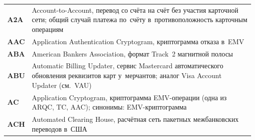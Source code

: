 %

\label{ch:glossary}

\begingroup
\footnotesize
\begin{longtable}{@{}p{4.5em}p{\dimexpr\linewidth-4.5em-2\tabcolsep\relax}@{}}
  \textbf{A2A}               & Account-to-Account, перевод со счёта на счёт без участия карточной сети; общий случай платежа по~счёту в~противоположность карточным операциям                                                                                                                       \\
  \textbf{AAC}               & Application Authentication Cryptogram, криптограмма отказа в~EMV                                                                                                                                                                                                                                 \\
  \textbf{ABA}               & American Bankers Association, формат Track~2 магнитной полосы                                                                                                                                                                                                                                    \\
  \textbf{ABU}               & Automatic Billing Updater, сервис Mastercard автоматического обновления реквизитов карт у~мерчантов; аналог Visa Account Updater (см.~VAU)                                                                                                                                                       \\
  \textbf{AC}                & Application Cryptogram, криптограмма EMV-операции (одна из ARQC, TC, AAC); синонимы: EMV-криптограмма                                                                                                                                                                                             \\
  \textbf{ACH}               & Automated Clearing House, расчётная сеть пакетных межбанковских переводов в~США                                                                                                                                                                                                                  \\

\end{longtable}
